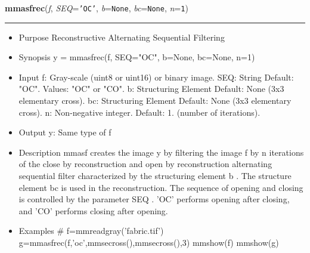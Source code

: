     \begin{boxedminipage}{\textwidth}

    \raggedright \textbf{mmasfrec}(\textit{f}, \textit{SEQ}=\texttt{'\-O\-C\-'\-}, \textit{b}=\texttt{N\-o\-n\-e\-}, \textit{bc}=\texttt{N\-o\-n\-e\-}, \textit{n}=\texttt{1\-})

    \vspace{-1.5ex}

    \rule{\textwidth}{0.5\fboxrule}
    \begin{itemize}
    \setlength{\parskip}{0.6ex}
      \item Purpose Reconstructive Alternating Sequential Filtering

      \item Synopsis y = mmasfrec(f, SEQ="OC", b=None, bc=None, n=1)

      \item Input f: Gray-scale (uint8 or uint16) or binary image. SEQ: 
        String Default: "OC". Values: "OC" or "CO". b: Structuring 
        Element Default: None (3x3 elementary cross). bc: Structuring 
        Element Default: None (3x3 elementary cross). n: Non-negative 
        integer. Default: 1. (number of iterations).

      \item Output y: Same type of f

      \item Description mmasf creates the image y by filtering the image f by 
        n iterations of the close by reconstruction and open by 
        reconstruction alternating sequential filter characterized by the 
        structuring element b . The structure element bc is used in the 
        reconstruction. The sequence of opening and closing is controlled 
        by the parameter SEQ . 'OC' performs opening after closing, and 
        'CO' performs closing after opening.

      \item Examples \# f=mmreadgray('fabric.tif') 
        g=mmasfrec(f,'oc',mmsecross(),mmsecross(),3) mmshow(f) mmshow(g)

    \end{itemize}

    \vspace{1ex}

    \end{boxedminipage}

    \label{multireg:num_pymorph:mmbench}
    \vspace{0.5ex}

